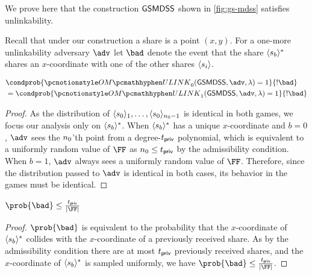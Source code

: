 We prove here that the construction $\mathsf{GSMDSS}$ shown in \cref{fig:gs-mdss} satisfies unlinkability.

Recall that under our construction a share is a point $(x, y)$.
For a one-more unlinkability adversary $\adv$ let $\bad$ denote the event that the share $\langle s_b \rangle^*$ shares an $x$-coordinate with one of the other shares $\langle s_i \rangle$.

\begin{claim}
	\label{cla:mdss-eq-when-uniq}
	\begin{align*}
		 & \condprob{\omulink_0(\gsmdss, \adv, \secpar) = 1}{!\bad}   \\
		 & = \condprob{\omulink_1(\gsmdss, \adv, \secpar) = 1}{!\bad}
	\end{align*}
\end{claim}

\begin{proof}
	As the distribution of $\langle s_0 \rangle_1,\dots,\langle s_0 \rangle_{n_0 - 1}$ is identical in both games, we focus our analysis only on $\langle s_b \rangle^*$.
	When $\langle s_b \rangle^*$ has a unique $x$-coordinate and $b = 0$, $\adv$ sees the $n_0$'th point from a degree-$t_{\mathsf{priv}}$ polynomial, which is equivalent to a uniformly random value of $\FF$ as $n_0 \leq t_{\mathsf{priv}}$ by the admissibility condition.
	When $b = 1$, $\adv$ always sees a uniformly random value of $\FF$.
	Therefore, since the distribution passed to $\adv$ is identical in both cases, its behavior in the games must be identical.
\end{proof}

\begin{claim}
	\label{cla:mdss-ul-bad-bound}
	$\prob{\bad} \leq \frac{\mdssPrivThr}{|\FF|}$
\end{claim}
\begin{proof}
	$\prob{\bad}$ is equivalent to the probability that the $x$-coordinate of $\langle s_b \rangle^*$ collides with the $x$-coordinate of a previously received share.
	As by the admissibility condition there are at most $t_{\mathsf{priv}}$ previously received shares, and the $x$-coordinate of $\langle s_b \rangle^*$ is sampled uniformly, we have $\prob{\bad} \leq \frac{\mdssPrivThr}{|\FF|}$.
\end{proof}

